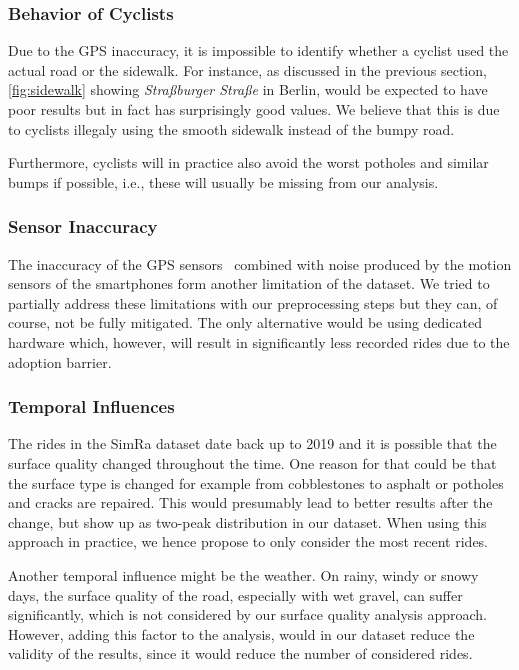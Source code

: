 \subsubsection{Behavior of Cyclists}
\label{subsubsec:behavior_of_cyclists}
Due to the GPS inaccuracy, it is impossible to identify whether a cyclist used the actual road or the sidewalk.
For instance, as discussed in the previous section, \cref{fig:sidewalk} showing \textit{Straßburger Straße} in Berlin, would be expected to have poor results but in fact has surprisingly good values.
We believe that this is due to cyclists illegaly using the smooth sidewalk instead of the bumpy road.

Furthermore, cyclists will in practice also avoid the worst potholes and similar bumps if possible, i.e., these will usually be missing from our analysis.

\subsubsection{Sensor Inaccuracy}
\label{subsubsec:sensor_inaccuracy}
The inaccuracy of the GPS sensors~\cite{merry2019smartphone} combined with noise produced by the motion sensors of the smartphones form another limitation of the dataset.
We tried to partially address these limitations with our preprocessing steps but they can, of course, not be fully mitigated.
The only alternative would be using dedicated hardware which, however, will result in significantly less recorded rides due to the adoption barrier.

\subsubsection{Temporal Influences}
\label{subsubsec:temporal_influences}
The rides in the SimRa dataset date back up to 2019 and it is possible that the surface quality changed throughout the time.
One reason for that could be that the surface type is changed for example from cobblestones to asphalt or potholes and cracks are repaired.
This would presumably lead to better results after the change, but show up as two-peak distribution in our dataset.
When using this approach in practice, we hence propose to only consider the most recent rides.

Another temporal influence might be the weather.
On rainy, windy or snowy days, the surface quality of the road, especially with wet gravel, can suffer significantly, which is not considered by our surface quality analysis approach.
However, adding this factor to the analysis, would in our dataset reduce the validity of the results, since it would reduce the number of considered rides.



